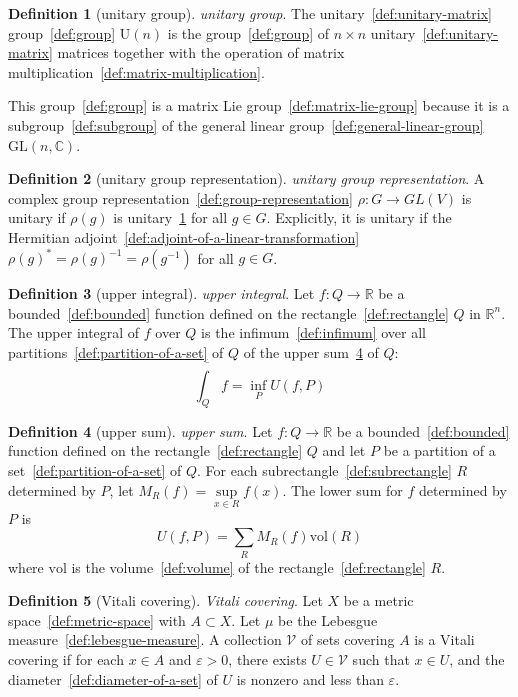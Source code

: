 \documentclass[12pt,a4paper]{article}
\theoremstyle{definition}
\newtheorem{definition}{Definition}
\begin{document}
\begin{definition}[unitary group]\label{def:unitary-group}
\emph{unitary group}. The unitary~\ref{def:unitary-matrix} group~\ref{def:group} $\text{U}(n)$ is the group~\ref{def:group} of $n\times n$ unitary~\ref{def:unitary-matrix} matrices together with the operation of matrix multiplication~\ref{def:matrix-multiplication}.

This group~\ref{def:group} is a matrix Lie group~\ref{def:matrix-lie-group} because it is a subgroup~\ref{def:subgroup} of the general linear group~\ref{def:general-linear-group} $\text{GL}(n,\mathbb C)$.
\end{definition}

\begin{definition}[unitary group representation]\label{def:unitary-group-representation}
\emph{unitary group representation}. A complex group representation~\ref{def:group-representation} $\rho: G\to GL(V)$ is unitary if $\rho(g)$ is unitary~\ref{def:unitary-group} for all $g\in G$.  Explicitly, it is unitary if the Hermitian adjoint~\ref{def:adjoint-of-a-linear-transformation} $\rho(g)^* =  \rho(g)^{-1} = \rho(g^{-1})$ for all $g\in G$.
\end{definition}

\begin{definition}[upper integral]\label{def:upper-integral}
\emph{upper integral}. Let $f:Q\to\mathbb R$ be a bounded~\ref{def:bounded} function defined on the rectangle~\ref{def:rectangle} $Q$ in $\mathbb R^n$. The upper integral of $f$ over $Q$ is the infimum~\ref{def:infimum} over all partitions~\ref{def:partition-of-a-set} of $Q$ of the upper sum~\ref{def:upper-sum} of $Q$: $$\overline{\int_Q}f = \inf_P U(f,P)$$
\end{definition}

\begin{definition}[upper sum]\label{def:upper-sum}
\emph{upper sum}. Let $f: Q\to \mathbb R$ be a bounded~\ref{def:bounded} function defined on the rectangle~\ref{def:rectangle} $Q$ and let $P$ be a partition of a set~\ref{def:partition-of-a-set} of $Q$. For each subrectangle~\ref{def:subrectangle} $R$ determined by $P$, let $M_R(f) = \sup\limits_{x\in R} f(x)$. The lower sum for $f$ determined by $P$ is $$U(f,P) = \sum_{R} M_R(f)\text{vol}(R)$$ where $\text{vol}$ is the volume~\ref{def:volume} of the rectangle~\ref{def:rectangle} $R$.
\end{definition}

\begin{definition}[Vitali covering]\label{def:vitali-covering}
\emph{Vitali covering}. Let $X$ be a metric space~\ref{def:metric-space} with $A \subset X$. Let $\mu$ be the Lebesgue measure~\ref{def:lebesgue-measure}. A collection $\mathcal V$ of sets covering $A$ is a Vitali covering if for each $x \in A$ and $\varepsilon > 0$, there exists $U \in \mathcal V$ such that $x \in U$, and the diameter~\ref{def:diameter-of-a-set} of $U$ is nonzero and less than $\varepsilon$.
\end{definition}
\end{document}
